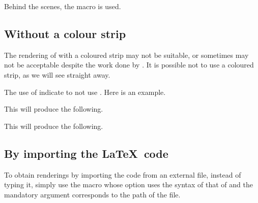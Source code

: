 \begin{tdocnote}
    Behind the scenes, the  macro is used.

    \begin{tdoclatex}[std]
    \end{tdoclatex}
\end{tdocnote}


\subsection{Without a colour strip}

The rendering of  with a coloured strip may not be suitable, or sometimes may not be acceptable despite the work done by .
It is possible not to use a coloured strip, as we will see straight away.


\begin{tdocexa}
    The use of  indicate to not use .
    Here is an example.


    This will produce the following.

    \medskip

    
\end{tdocexa}




\begin{tdocexa}
    \leavevmode


    This will produce the following.

    \medskip

    
\end{tdocexa}


\subsection{By importing the \LaTeX\ code}

To obtain renderings by importing the code from an external file, instead of typing it, simply use the  macro whose option uses the syntax of that of  and the mandatory argument corresponds to the path of the file.


